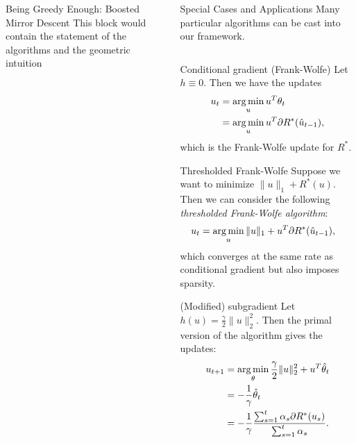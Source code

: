 \documentclass[final]{beamer}
\begin{document}
\begin{frame}{}
\begin{columns}
\begin{column}{0.48\linewidth}
\begin{block}{\large Being Greedy Enough: Boosted Mirror Descent}
This block would contain the statement of the algorithms and the geometric intuition 
\end{block}
\end{column}	

	


\begin{column}{0.48\linewidth}

\begin{block}{\large Special Cases and Applications}
Many particular algorithms can be cast into our framework.
\begin{columns}[t]
\begin{column}{0.45\linewidth}

\begin{block}{Conditional gradient (Frank-Wolfe)}
Let $h \equiv 0$. Then we have the updates
\begin{align*}
u_t &= \argmin_u u^T\theta_t \\
 &= \argmin_u u^T\partial R^*(\hat{u}_{t-1}),
\end{align*}
which is the Frank-Wolfe update for $R^*$.
\end{block}

\begin{block}{Thresholded Frank-Wolfe}
Suppose we want to minimize $\|u\|_1 + R^*(u)$. Then 
we can consider the following 
\emph{thresholded Frank-Wolfe algorithm}:
\begin{align*}
u_t &= \argmin_u \|u\|_1 + u^T\partial R^*(\hat{u}_{t-1}),
\end{align*}
which converges at the same rate as conditional gradient 
but also imposes sparsity.
\end{block}

\begin{block}{(Modified) subgradient}
Let $h(u) = \frac{\gamma}{2} \|u\|_2^2$. Then the primal version of the 
algorithm gives the updates:
\begin{align*}
u_{t+1} &= \argmin_{\theta} \frac{\gamma}{2}\|u\|_2^2 + u^T\hat{\theta}_t \\
 &= -\frac{1}{\gamma}\hat{\theta}_t \\
 &= -\frac{1}{\gamma} \frac{\sum_{s=1}^t \alpha_s \partial R^*(u_s)}{\sum_{s=1}^t \alpha_s}.
\end{align*}
\end{block}


\end{column}
\end{columns}
\end{block}
\end{column}
\end{columns}
\end{frame}
\end{document}
